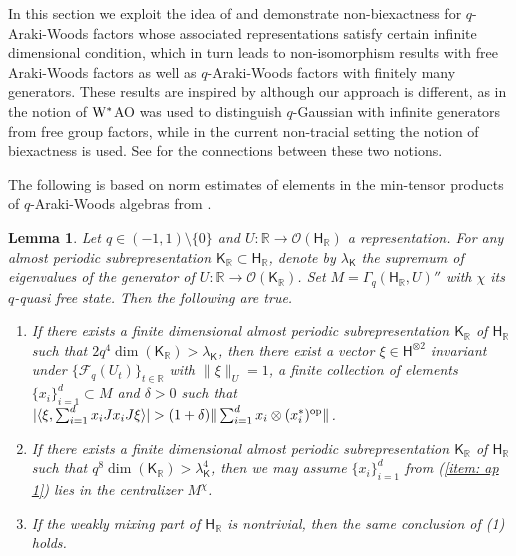 \documentclass[a4paper,11pt]{amsart}
\newtheorem{lem}[thm]{Lemma}
\theoremstyle{definition}
\newcommand{\R}{{\mathbb R}}
\newcommand{\cF}{{\mathcal F}}
\newcommand{\cO}{{\mathcal O}}
\newcommand{\sH}{\mathsf{H}}
\newcommand{\sK}{\mathsf{K}}
\newcommand{\ot}{\otimes}
\newcommand{\op}{{\rm op}}
\begin{document}
In this section we exploit the idea of \cite{BCKW23} and demonstrate non-biexactness for $q$-Araki-Woods factors 
	whose associated representations satisfy certain infinite dimensional condition,
	which in turn leads to non-isomorphism results with free Araki-Woods factors as well as $q$-Araki-Woods factors
	with finitely many generators.
These results are inspired by \cite{Cas23} although our approach is different, 
	as in \cite{Cas23} the notion of ${\rm W}^*$AO was used to distinguish $q$-Gaussian with infinite generators from free group factors,
	while in the current non-tracial setting the notion of biexactness is used.
See \cite[Section 7.3]{DP23} for the connections between these two notions.

The following is based on norm estimates of elements in the min-tensor products of $q$-Araki-Woods algebras from \cite{Nou04, Hia03}.
\begin{lem}\label{lem: non-AO lower bound}
Let $q\in (-1,1)\setminus\{0\}$ and $U:\R\to \cO(\sH_\R)$ a representation.
For any almost periodic subrepresentation $\sK_\R\subset \sH_\R$, denote by $\lambda_{\sK}$ the supremum of eigenvalues of the generator of 
	$U:\R\to \cO(\sK_\R)$.
Set $M=\Gamma_q(\sH_\R, U)''$ with $\chi$ its $q$-quasi free state.
Then the following are true.
\begin{enumerate}
	\item If there exists a finite dimensional almost periodic subrepresentation $\sK_\R$ of $\sH_\R$ such that $2 q^4 \dim(\sK_\R)>\lambda_\sK$,
	then there exist a vector $\xi\in \sH^{\ot 2}$ invariant under $\{\cF_q(U_t)\}_{t\in\R}$ with $\|\xi\|_U=1$, 
		a finite collection of elements $\{x_i\}_{i=1}^d\subset M$
			and $\delta>0$
			such that $|\langle \xi, \sum_{i=1}^d x_i Jx_iJ \xi\rangle|>(1+\delta)\|\sum_{i=1}^d x_i \ot (x_i^*)^{\op}\|$. \label{item: ap 1}
	\item  If there exists a finite dimensional almost periodic subrepresentation $\sK_\R$ of $\sH_\R$ such that $q^8 \dim(\sK_\R)>\lambda_\sK^4$,
		then we may assume $\{x_i\}_{i=1}^d$ from (\ref{item: ap 1}) lies in the centralizer $M^\chi$.\label{item: ap 2}
	\item If the weakly mixing part of $\sH_\R$ is nontrivial, then the same conclusion of (1) holds.\label{item: wm}
\end{enumerate}
\end{lem}
\end{document}
